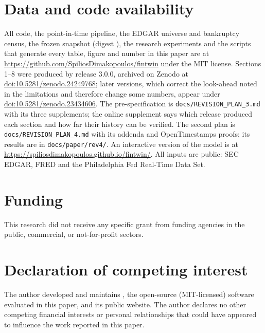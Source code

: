 \documentclass[preprint,12pt,authoryear]{elsarticle}
\newif\ifanon\anonfalse
\newcommand{\twin}{\ifanon\textsc{Sim}\else\twinname\fi}
\newcommand{\repoid}[1]{\ifanon[withheld]\else\texttt{#1}\fi}
\newcommand{\twinname}{FinTwin}
\begin{document}
\section*{Data and code availability}
\ifanon
All code, the point-in-time pipeline, the EDGAR universe and bankruptcy census, the frozen snapshot (digest \repoid{\SnapDigest}), the research experiments, the pre-specification with its history and the scripts that generate every table, figure and number in this paper are in a public repository under the MIT license and are archived with a DOI; the links are withheld for anonymous review and are available to the editor. All inputs are public: SEC EDGAR, FRED and the Philadelphia Fed Real-Time Data Set.
\else
All code, the point-in-time pipeline, the EDGAR universe and bankruptcy census, the frozen snapshot (digest \repoid{\SnapDigest}), the research experiments and the scripts that generate every table, figure and number in this paper are at \url{https://github.com/SpiliosDimakopoulos/fintwin} under the MIT license. Sections 1--8 were produced by release 3.0.0, archived on Zenodo at \href{https://doi.org/10.5281/zenodo.24249768}{doi:10.5281/zenodo.24249768}; later versions, which correct the look-ahead noted in the limitations and therefore change some numbers, appear under \href{https://doi.org/10.5281/zenodo.23434606}{doi:10.5281/zenodo.23434606}. The pre-specification is \repoid{docs/REVISION\_PLAN\_3.md} with its three supplements; the online supplement says which release produced each section and how far their history can be verified. The second plan is \repoid{docs/REVISION\_PLAN\_4.md} with its addenda and OpenTimestamps proofs; its results are in \repoid{docs/paper/rev4/}. An interactive version of the model is at \url{https://spiliosdimakopoulos.github.io/fintwin/}. All inputs are public: SEC EDGAR, FRED and the Philadelphia Fed Real-Time Data Set.
\fi

\ifanon
\section*{Funding}
This research did not receive any specific grant from funding agencies in the public, commercial, or not-for-profit sectors.
\else
\section*{Declaration of competing interest}
The author developed and maintains \twin{}, the open-source (MIT-licensed) software evaluated in this paper, and its public website. The author declares no other competing financial interests or personal relationships that could have appeared to influence the work reported in this paper.
\end{document}
